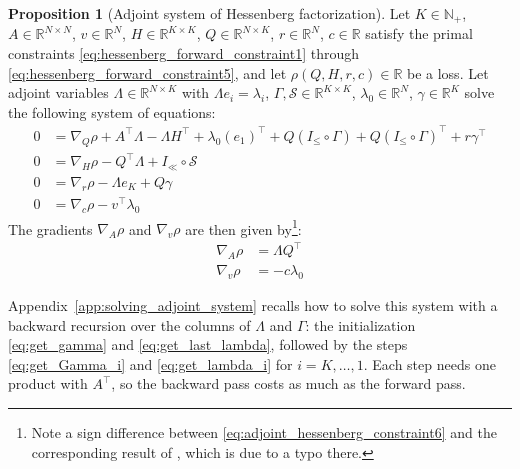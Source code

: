 \documentclass[a4paper,12pt]{article}
\theoremstyle{definition}
\newtheorem{proposition}{Proposition}
\begin{document}
\begin{proposition}[Adjoint system of Hessenberg factorization]\label{prop:hessenberg_adjoint}
Let $K \in \mathbb{N}_+$, $A \in \mathbb{R}^{N\times N}$, $v \in \mathbb{R}^N$, $H \in \mathbb{R}^{K\times K}$, $Q \in \mathbb{R}^{N\times K}$, $r \in \mathbb{R}^N$, $c \in \mathbb{R}$ satisfy the primal constraints \eqref{eq:hessenberg_forward_constraint1} through \eqref{eq:hessenberg_forward_constraint5}, and let $\rho(Q, H, r, c) \in \mathbb{R}$ be a loss. Let adjoint variables $\Lambda \in \mathbb{R}^{N\times K}$ with $\Lambda e_i = \lambda_i$, $\Gamma, \mathcal{S} \in \mathbb{R}^{K\times K}$, $\lambda_0 \in \mathbb{R}^N$, $\gamma \in \mathbb{R}^K$ solve the following system of equations:
\begin{align}
0 &= \nabla_{Q} \rho + A^\top \Lambda - \Lambda H^\top + \lambda_0 (e_{1})^\top 
   + Q(I_{\leq} \circ \Gamma) + Q(I_{\leq} \circ \Gamma)^\top + r \gamma^\top \label{eq:adjoint_hessenberg_constraint1}\\ 
0 &= \nabla_{H} \rho - Q^\top \Lambda + I_{\ll} \circ \mathcal{S} \label{eq:adjoint_hessenberg_constraint2}\\
0 &= \nabla_{r} \rho - \Lambda e_{K} + Q \gamma \label{eq:adjoint_hessenberg_constraint3}\\
0 &= \nabla_{c} \rho - v^\top \lambda_0 \label{eq:adjoint_hessenberg_constraint4}
\end{align}
The gradients $\nabla_A\rho$ and $\nabla_v\rho$ are then given by\footnote{Note a sign difference between \eqref{eq:adjoint_hessenberg_constraint6} and the corresponding result of \citet{kraemer2024gradients}, which is due to a typo there.}:
\begin{align}
    \nabla_A\rho &= \Lambda Q^\top \label{eq:adjoint_hessenberg_constraint5} \\
    \nabla_v\rho &= -c\lambda_0 \label{eq:adjoint_hessenberg_constraint6}
\end{align}
\end{proposition}
Appendix~\ref{app:solving_adjoint_system} recalls how to solve this system with a backward recursion over the columns of $\Lambda$ and $\Gamma$: the initialization \eqref{eq:get_gamma} and \eqref{eq:get_last_lambda}, followed by the steps \eqref{eq:get_Gamma_i} and \eqref{eq:get_lambda_i} for $i = K, \dots, 1$. Each step needs one product with $A^\top$, so the backward pass costs as much as the forward pass.
\end{document}

